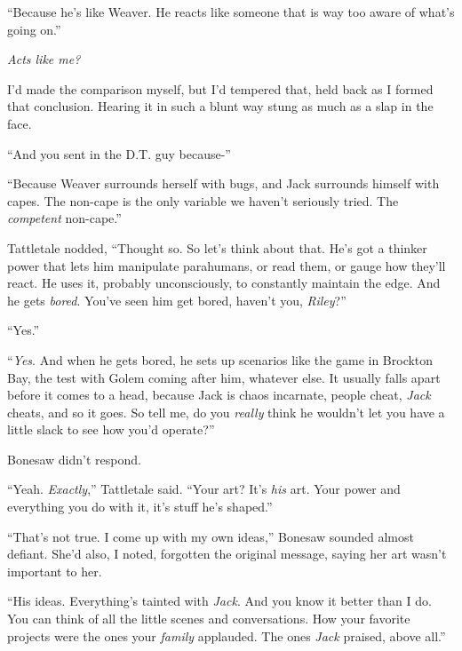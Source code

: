 ``Because he's like Weaver.  He reacts like someone that is way too aware of what's going on.''



\emph{Acts like me?}



I'd made the comparison myself, but I'd tempered that, held back as I formed that conclusion.  Hearing it in such a blunt way stung as much as a slap in the face.



``And you sent in the D.T. guy because-''



``Because Weaver surrounds herself with bugs, and Jack surrounds himself with capes.  The non-cape is the only variable we haven't seriously tried.  The \emph{competent} non-cape.''



Tattletale nodded, ``Thought so.  So let's think about that.  He's got a thinker power that lets him manipulate parahumans, or read them, or gauge how they'll react.  He uses it, probably unconsciously, to constantly maintain the edge.  And he gets \emph{bored}.  You've seen him get bored, haven't you, \emph{Riley}?''



``Yes.''



``\emph{Yes}.  And when he gets bored, he sets up scenarios like the game in Brockton Bay, the test with Golem coming after him, whatever else.  It usually falls apart before it comes to a head, because Jack is chaos incarnate, people cheat, \emph{Jack} cheats, and so it goes.  So tell me, do you \emph{really} think he wouldn't let you have a little slack to see how you'd operate?''



Bonesaw didn't respond.



``Yeah.  \emph{Exactly},'' Tattletale said.  ``Your art?  It's \emph{his} art.  Your power and everything you do with it, it's stuff he's shaped.''



``That's not true.  I come up with my own ideas,'' Bonesaw sounded almost defiant.  She'd also, I noted, forgotten the original message, saying her art wasn't important to her.



``His ideas.  Everything's tainted with \emph{Jack}.  And you know it better than I do.  You can think of all the little scenes and conversations.  How your favorite projects were the ones your \emph{family} applauded.  The ones \emph{Jack} praised, above all.''



